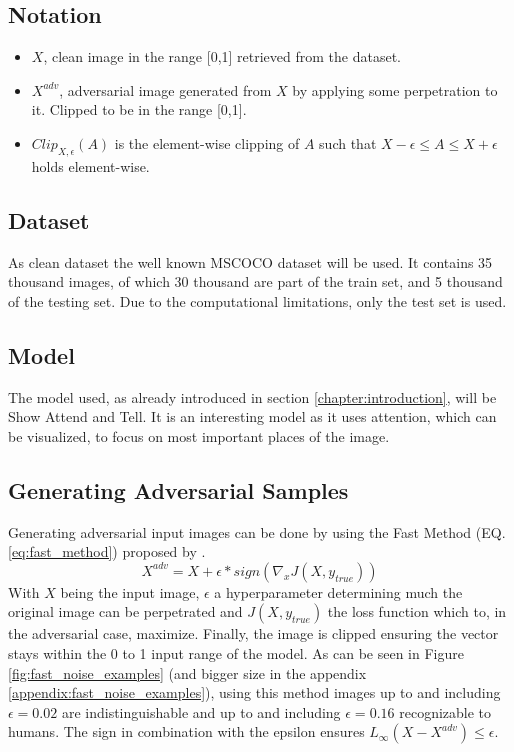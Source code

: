 \subsection{Notation}
\begin{itemize}
    \item $X$, clean image in the range [0,1] retrieved from the dataset.
    \item $X^{adv}$, adversarial image generated from $X$ by applying some perpetration to it. Clipped to be in the range [0,1].
    \item $Clip_{X,\epsilon}(A)$ is the element-wise clipping of $A$ such that $X -\epsilon \leq A \leq X + \epsilon$ holds element-wise.
\end{itemize}

\subsection{Dataset}
As clean dataset the well known MSCOCO \cite{lin2015microsoft} dataset will be used. It contains 35 thousand images, of which 30 thousand are part of the train set, and 5 thousand of the testing set. Due to the computational limitations, only the test set is used.

\subsection{Model}
The model used, as already introduced in section \ref{chapter:introduction}, will be Show Attend and Tell. It is an interesting model as it uses attention, which can be visualized, to focus on most important places of the image.

\subsection{Generating Adversarial Samples}
Generating adversarial input images can be done by using the Fast Method (EQ. \ref{eq:fast_method}) proposed by \citeauthor{goodfellow2015explaining}.
\begin{equation}
    X^{adv} = X + \epsilon * sign(\nabla_{x}J(X, y_{true}))
    \label{eq:fast_method}
\end{equation}
With $X$ being the input image, $\epsilon$ a hyperparameter determining much the original image can be perpetrated and $J(X, y_{true})$ the loss function which to, in the adversarial case, maximize. Finally, the image is clipped ensuring the vector stays within the 0 to 1 input range of the model. As can be seen in Figure \ref{fig:fast_noise_examples} (and bigger size in the appendix \ref{appendix:fast_noise_examples}), using this method images up to and including $\epsilon=0.02$ are indistinguishable and up to and including $\epsilon=0.16$ recognizable to humans. The sign in combination with the epsilon ensures $L_{\infty}(X - X^{adv}) \leq \epsilon$.

